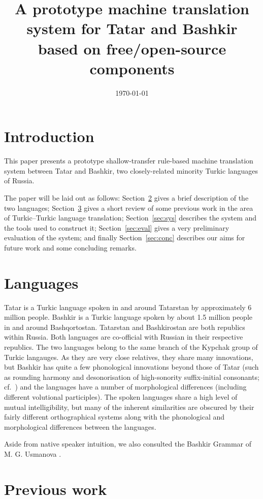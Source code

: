 \documentclass[11pt,a4paper]{article}
\title{A prototype machine translation system for Tatar and Bashkir based on 
   free/open-source components}
\date{\today}
\begin{document}
\maketitleabstract

\section{Introduction}

This paper presents a prototype shallow-transfer rule-based machine translation
system between Tatar and Bashkir, two closely-related minority Turkic 
languages of Russia. 

The paper will be laid out as follows: Section~\ref{sec:lang} gives a brief description
of the two languages; Section~\ref{sec:prev} gives a short review of some previous
work in the area of Turkic--Turkic language translation; Section~\ref{sec:sys} 
describes the system and the tools used to construct it; Section~\ref{sec:eval}
gives a very preliminary evaluation of the system; and finally Section~\ref{sec:conc}
describes our aims for future work and some concluding remarks.

\section{Languages}
\label{sec:lang}

Tatar is a Turkic language spoken in and around Tatarstan by approximately 6 million people.  Bashkir is a Turkic language spoken by about 1.5 million people in and around Bashqortostan.  Tatarstan and Bashkirostan are both republics within Russia.  Both languages are co-official with Russian in their respective republics.  The two languages belong to the same branch of the Kypchak group of Turkic langauges.  As they are very close relatives, they share many innovations, but Bashkir has quite a few phonological innovations beyond those of Tatar (such as rounding harmony and desonorisation of high-sonority suffix-initial consonants; cf.\ \cite{washington10}) and the languages have a number of morphological differences (including different volutional participles).  The spoken languages share a high level of mutual intelligibility, but many of the inherent similarities are obscured by their fairly different orthographical systems along with the phonological and morphological differences between the languages.

Aside from native speaker intuition, we also consulted the Bashkir Grammar of M. G. Usmanova \cite{usmanova06}.

\section{Previous work}
\label{sec:prev}
\end{document}
